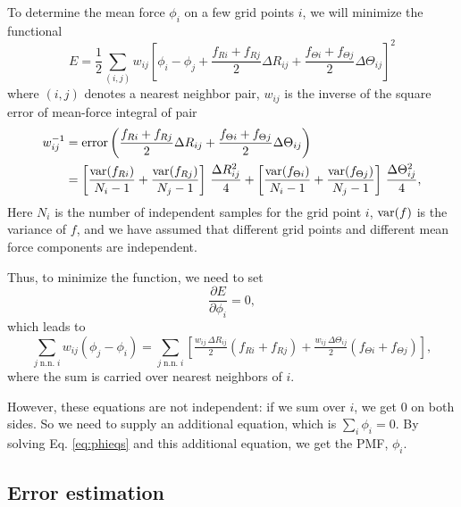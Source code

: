 \documentclass{article}
\begin{document}
To determine the mean force $\phi_i$ on a few grid points $i$,
we will minimize the functional
$$
E
=
\frac 1 2
\sum_{(i, j)}
  w_{ij}
  \left[
  \phi_i - \phi_j
  +
    \frac{ f_{Ri} + f_{Rj} } { 2 } \Delta R_{ij}
       +
    \frac{ f_{\Theta i} + f_{\Theta j} } { 2 } \Delta \Theta_{ij}
  \right]^2
$$
where
$(i, j)$ denotes a nearest neighbor pair,
$w_{ij}$ is the inverse of the square error of mean-force integral
of pair
\begin{align*}
  w_{ij}^{-1}
&=
  \mathrm{error}
  \left(
    \frac{ f_{Ri} + f_{Rj} } { 2 } \Delta R_{ij}
       +
    \frac{ f_{\Theta i} + f_{\Theta j} } { 2 } \Delta \Theta_{ij}
  \right)
\\
&=
  \left[
    \frac{ \mathrm{var} (f_{Ri}) } { N_i - 1 }
  + \frac{ \mathrm{var} (f_{Rj}) } { N_j - 1}
  \right]
  \, \frac{ \Delta R_{ij}^2 } { 4 }
  +
  \left[
    \frac{ \mathrm{var} (f_{\Theta i}) } { N_i - 1}
  + \frac{ \mathrm{var} (f_{\Theta j}) } { N_j - 1}
  \right]
  \, \frac{ \Delta \Theta_{ij}^2 } { 4 }
,
\end{align*}
Here
$N_i$ is the number of independent samples for the grid point $i$,
$\mathrm{var} (f)$ is the variance of $f$,
and we have assumed that different grid points and
different mean force components are independent.

Thus, to minimize the function, we need to set
$$
\frac{ \partial E } { \partial \phi_i }
=
0,
$$
%
which leads to
\begin{equation}
\sum_{j \mathrm{\; n.n. \; } i }
  w_{ij} ( \phi_j - \phi_i )
=
\sum_{j \mathrm{\; n.n. \; } i }
  \left[
  \tfrac { w_{ij} \, \Delta R_{ij} } 2
  (f_{Ri} + f_{Rj})
  +
  \tfrac { w_{ij} \, \Delta \Theta_{ij} } 2
  (f_{\Theta i} + f_{\Theta j})
  \right]
,
\label{eq:phieqs}
\end{equation}
where the sum is carried over nearest neighbors of $i$.

However, these equations are not independent:
if we sum over $i$, we get $0$ on both sides.
%
So we need to supply an additional equation,
which is $\sum_i \phi_i = 0$.
%
By solving Eq. \eqref{eq:phieqs} and this additional equation,
we get the PMF, $\phi_i$.

\subsection{Error estimation}
\end{document}
